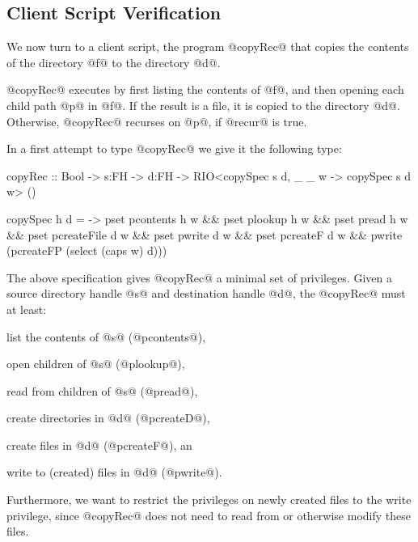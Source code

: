 \subsection{Client Script Verification}
\label{sec:fs-client}
%
We now turn to a client script,
the program @copyRec@ %
that copies the contents of the directory @f@ to the
directory @d@.
%
%
@copyRec@ executes by first listing the contents of @f@, 
and then opening each child path @p@ in @f@. 
%
If the result is a file, it is copied to the directory @d@.
%
Otherwise, @copyRec@ recurses on @p@, if @recur@ is true.

In a first attempt to type @copyRec@ we give it the following type:
\begin{code}
  copyRec :: Bool -> s:FH -> d:FH ->
             RIO<copySpec s d,
                 \_ _ w -> copySpec s d w> () 

 copySpec h d = \w ->
   pset pcontents h w && pset plookup h     w &&
   pset pread h     w && pset pcreateFile d w &&
   pset pwrite d    w && pset pcreateF d    w &&
   pwrite (pcreateFP (select (caps w) d)))
\end{code}              
%
The above specification gives @copyRec@ a minimal set of privileges. 
%
Given a source directory handle @s@ and destination handle @d@, the
@copyRec@ must at least:
%
\begin{inparaenum}[(1)]
  \item list the contents of @s@ (@pcontents@),
  \item open children of @s@ (@plookup@),
  \item read from children of @s@ (@pread@),
  \item create directories in @d@ (@pcreateD@),
  \item create files in @d@ (@pcreateF@), an
  \item write to (created) files in @d@ (@pwrite@).
\end{inparaenum}
%
Furthermore, we want to restrict the privileges on newly created files
to the write privilege, since @copyRec@ does not need to read from or
otherwise modify these files.

